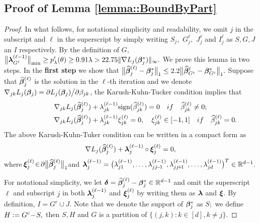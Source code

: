 \documentclass[twoside,11pt]{article}
\newcommand{\defeq}{\vcentcolon=}
\newcommand*{\BR}{\mathbb{R}}
\newcommand*{\hbbeta}{\hat{\bbeta}}
\newcommand*{\bbetas}{\bbeta^*}
\newcommand*{\gradstarss} {\nabla {L_j}(\bbeta^*_{j})}
\newcommand*{\hbbetas}{\hat{\bbeta}_{j}}
\newcommand*{\bbetass}{\bbeta^*_{j}}
\begin{document}
\subsection{Proof of Lemma \ref{lemma::BoundByPart}}\label{proof::lemma::BoundByPart}
\begin{proof} 
In what follows, for notational simplicity and readability, we omit $j$ in the subscript and $\ell$ in the superscript by simply writing $S_j,$ $G_j^\ell, $ $J_j^\ell$ and $I_j^\ell$ as $S, G, J$ an $I$ respectively. By the definition of $G$,
$\bigl\| \blambda_{G^{\ell}}^{(\ell-1)}\bigr \|_{\min} \geq p_{\lambda}'(\theta) \geq 0.91 \lambda >  22.75\| \gradstarss\|_\infty.$
We prove this lemma in two steps. In the {\bf first step} we show that $\bigl \| \hbbeta_j^{(\ell)} - \bbetas_j \bigr\|_1 \leq 2.2\bigl\|\hbbeta_{G^c}^{\ell}-\bbetas_{G^c}\bigl\|_1.$
Suppose that  $\hbbetas^{(\ell)}$ is the solution in the $\ell$-th iteration and we denote $\nabla_{jk} L_j(\bm{\beta}_j) = \partial L_j(\bm{\beta}_j) \big/\partial \beta_{jk}$, the  Karush-Kuhn-Tucker condition implies that 
\begin{align*}
& \nabla_{jk } L_j(\hbbetas^{(\ell)}) + \lambda_{jk}^{(\ell-1)}\text{sign}( \hat{\beta}_{jk}^{(\ell)}) = 0 \quad if \quad\hat{\beta}_{jk}^{(\ell)} \neq 0;\\
\lefteqn{\nabla_{jk} L_j (\hbbetas^{(\ell)}) + \lambda_{jk}^{(\ell-1)}\xi_{jk}^{(\ell)} = 0,\quad\xi_{jk}^{(\ell)} \in [-1,1] \quad if  \quad \hat{\beta}_{jk}^{(\ell)}= 0.}
\end{align*}
 The above Karush-Kuhn-Tuker condition can be written in a compact form as
\begin{align}\label{equ::kkt}
\nabla L_j(\hbbetas^{(\ell)}) + \blambda_{j}^{(\ell-1)}\circ \bxi_j^{(\ell)} = 0,
\end{align}
where $\!\bxi_j^{(\ell)} \!\in \! \partial \big\|\hbbetas^{(\ell)}\big\|_1\!\!$ and $\blambda_{j}^{(\ell-1)} = \bigl (\lambda_{j1}^{(\ell-1)},\ldots, \lambda_{j j\!-\!1}^{(\ell-1)},\lambda_{j j\!+\!1}^{(\ell-1)} ,\ldots,\lambda_{jd}^{(\ell-1)}\bigr)^T \in \BR^{d-1}.$

For notational  simplicity, we let $\bdelta= \hbbetas^{(\ell)} - \bbetass \in \BR^{d-1}$   and  omit the superscript  $\ell$ and subscript $j$ in both $\bm{\lambda}_{j}^{(\ell-1)}$ and   $\bm{\xi}_j^{(\ell)}$  by writing   them  as $\bm{\lambda}$ and  $\bm{\xi}$.
  By definition, $I = G^c \cup J$. Note that we denote the  support of $\bbetass$ as $S;$ we define $H \defeq G^c\! -\! S,$ then $S,H$ and $G$ is a partition of $ \bigl\{ (j,k)\colon k\!\in \![d], k\!\neq\! j \bigr\}.$


\end{proof}
\end{document}
